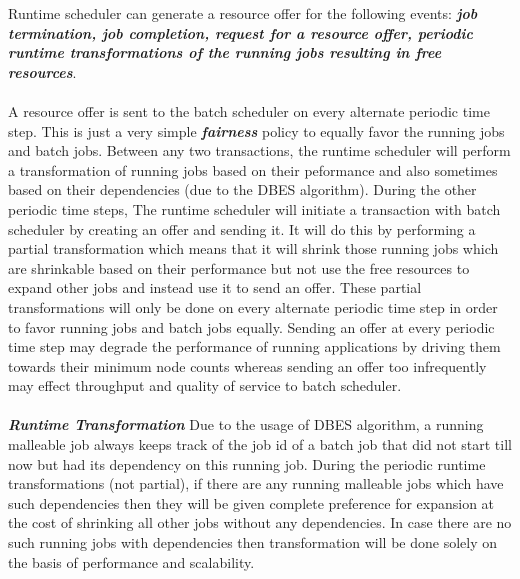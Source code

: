Runtime scheduler can generate a resource offer for the following events: \textbf{\textit{job termination, job completion, request for a resource offer, periodic runtime transformations of the running jobs resulting in free resources}}.\\ \\
A resource offer is sent to the batch scheduler on every alternate periodic time step. This is just a very simple \textbf{\textit{fairness}} policy to equally favor the running jobs and batch jobs. Between any two transactions, the runtime scheduler will perform a transformation of running jobs based on their peformance and also sometimes based on their dependencies (due to the DBES algorithm). During the other periodic time steps, The runtime scheduler will initiate a transaction with batch scheduler by creating an offer and sending it. It will do this by performing a partial transformation which means that it will shrink those running jobs which are shrinkable based on their performance but not use the free resources to expand other jobs and instead use it to send an offer. These partial transformations will only be done on every alternate periodic time step in order to favor running jobs and batch jobs equally. Sending an offer at every periodic time step may degrade the performance of running applications by driving them towards their minimum node counts whereas sending an offer too infrequently may effect throughput and quality of service to batch scheduler.\\ \\
\textbf{\textit{Runtime Transformation}} Due to the usage of DBES algorithm, a running malleable job always keeps track of the job id of a batch job that did not start till now but had its dependency on this running job. During the periodic runtime transformations (not partial), if there are any running malleable jobs which have such dependencies then they will be given complete preference for expansion at the cost of shrinking all other jobs without any dependencies. In case there are no such running jobs with dependencies then transformation will be done solely on the basis of performance and scalability.
\clearpage
\setcounter{AlgoLine}{0}
